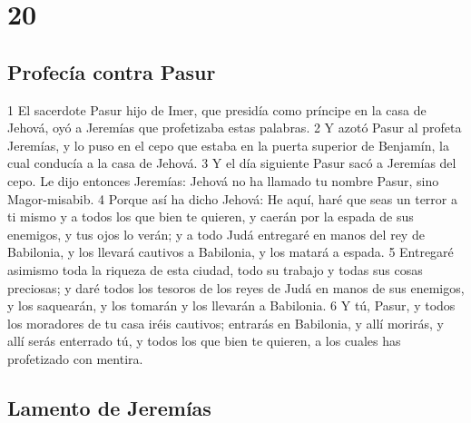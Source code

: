\chapter{20}

\section*{Profecía contra Pasur}

1 El sacerdote Pasur hijo de Imer, que presidía como príncipe en la casa de Jehová, oyó a Jeremías que profetizaba estas palabras.
2 Y azotó Pasur al profeta Jeremías, y lo puso en el cepo que estaba en la puerta superior de Benjamín, la cual conducía a la casa de Jehová.
3 Y el día siguiente Pasur sacó a Jeremías del cepo. Le dijo entonces Jeremías: Jehová no ha llamado tu nombre Pasur, sino Magor-misabib.
4 Porque así ha dicho Jehová: He aquí, haré que seas un terror a ti mismo y a todos los que bien te quieren, y caerán por la espada de sus enemigos, y tus ojos lo verán; y a todo Judá entregaré en manos del rey de Babilonia, y los llevará cautivos a Babilonia, y los matará a espada.
5 Entregaré asimismo toda la riqueza de esta ciudad, todo su trabajo y todas sus cosas preciosas; y daré todos los tesoros de los reyes de Judá en manos de sus enemigos, y los saquearán, y los tomarán y los llevarán a Babilonia.
6 Y tú, Pasur, y todos los moradores de tu casa iréis cautivos; entrarás en Babilonia, y allí morirás, y allí serás enterrado tú, y todos los que bien te quieren, a los cuales has profetizado con mentira.

\section*{Lamento de Jeremías}

